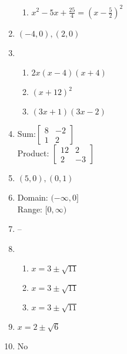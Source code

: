 \documentclass{article}
\begin{document}
\begin{enumerate}
\begin{enumerate}
	\item $x^2 - 5x + \frac{25}{4} = (x - \frac{5}{2})^2$
	
	\end{enumerate}

\item $(-4, 0), (2, 0)$

\item

	\begin{enumerate}
	
	\item $2x(x - 4)(x + 4)$
	
	\item $(x + 12)^2$
	
	\item $(3x + 1)(3x - 2)$
	
	\end{enumerate}

\item Sum:$\begin{bmatrix}
	8 & -2 \\
	1 & 2
	\end{bmatrix}$ \\
	
	Product: $\begin{bmatrix}
	12 & 2 \\
	2 & -3
	\end{bmatrix}$
	
\item $(5, 0), (0, 1)$

\item Domain: $(-\infty, 0]$ \\
	Range: $[0, \infty)$
	
\item --

\item

	\begin{enumerate}
	
	\item $x = 3 \pm \sqrt{11}$
		
	\item $x = 3 \pm \sqrt{11}$	
	
	\item $x = 3 \pm \sqrt{11}$
	
	\end{enumerate}
	
\item $x = 2 \pm \sqrt{6}$

\item No


\end{enumerate}
\end{document}
